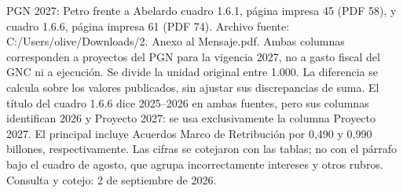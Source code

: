 \begin{frame}{PGN 2027: Petro frente a Abelardo}
{cuadro 1.6.1, página impresa 45 (PDF 58), y cuadro 1.6.6, página impresa 61 (PDF 74).
Archivo fuente: C:/Users/olive/Downloads/2. Anexo al Mensaje.pdf.
Ambas columnas corresponden a proyectos del PGN para la vigencia 2027, no a gasto
fiscal del GNC ni a ejecución. Se divide la unidad original entre 1.000. La diferencia
se calcula sobre los valores publicados, sin ajustar sus discrepancias de suma.
El título del cuadro 1.6.6 dice 2025--2026 en ambas fuentes, pero sus columnas
identifican 2026 y Proyecto 2027: se usa exclusivamente la columna Proyecto 2027.
El principal incluye Acuerdos Marco de Retribución por 0,490 y 0,990 billones,
respectivamente. Las cifras se cotejaron con las tablas; no con el párrafo bajo
el cuadro de agosto, que agrupa incorrectamente intereses y otros rubros.
Consulta y cotejo: 2 de septiembre de 2026.}
\end{frame}
